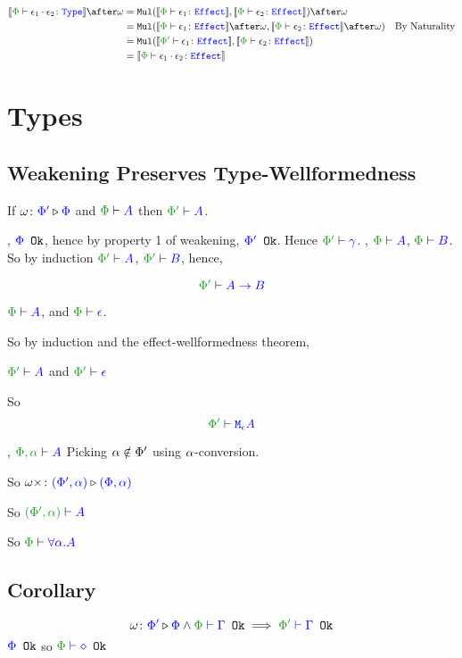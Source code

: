 \documentclass{report}
\begin{document}
\begin{align*}
    \deno{\typerelation{\P}{\e_1\dot\e_2}{\type}} \after\w &=
    \Mul(\deno{\typerelation{\P}{\e_1}{\effect}}, \deno{\typerelation{\P}{\e_2}{\effect}})\after \w \\
    & = \Mul(\deno{\typerelation{\P}{\e_1}{\effect}}\after \w, \deno{\typerelation{\P}{\e_2}{\effect}}\after \w)\qt{By Naturality}\\
    & = \Mul(\deno{\typerelation{\P'}{\e_1}{\effect}}, \deno{\typerelation{\P}{\e_2}{\effect}})\\
    & = \deno{\typerelation{\P}{\e_1\dot\e_2}{\effect}}
\end{align*}

\section{Types}
\subsection{Weakening Preserves Type-Wellformedness}

    If $\omega \colon {\color{blue}\Phi'} \triangleright {\color {blue} \Phi}$ and $\wellformed{\P}{A}$ then $\wellformed{\P'}{A}$.

    \proof
    \bi, ${\color{blue} \Phi} \texttt{ Ok}$, hence by property 1 of weakening, ${\color{blue} \Phi'} \texttt{ Ok}$. Hence $\wellformed{\P'}{\g}$.
    \bi, $\wellformed{\P}{A}$, $\wellformed{\P}{B}$.
    So by induction $\wellformed{\P'}{A}$, $\wellformed{\P'}{B}$, hence,

    $$\wellformed{\P'}{\ab}$$


    \bi $\wellformed{\P}{A}$, and $\wellformed{\P}{\e}$.

    So by induction and the effect-wellformedness theorem, 

    $\wellformed{\P'}{A}$ and $\wellformed{\P'}{\e}$

    So $$\wellformed{\P'}{\mea}$$

    \bi, $\wellformed{\P,\a}{A}$
    Picking $\alpha\notin\Phi'$ using $\alpha$-conversion.

    So $\omega\times \colon {\color{blue}(\Phi', \alpha)} \triangleright {\color {blue} (\Phi, \alpha)}$

    So $\wellformed{(\P', \a)}{A}$

    So $\wellformed{\P}{\all{\a}{A}}$

    \subsection{Corollary}
    $$\wrel{\w}{\P'}{\P}\wedge \wellformedok{\P}{\G} \implies \wellformedok{\P'}{\G}$$
    \bi ${\color{blue} \Phi} \texttt{ Ok}$ so $\wellformedok{\P}{\nil}$
\end{document}
